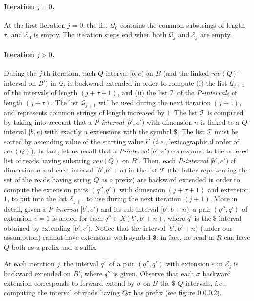\documentclass[runningheads,envcountsame,a4paper]{llncs}
\newcommand{\ie}{\textit{i.e.},\xspace}
\begin{document}
\paragraph{Iteration $j = 0$.}

At the first iteration $j=0$, the list $\mathcal{Q}_0$ contains the
common substrings of length $\tau$, and $\mathcal{E}_0$ is empty.
The iteration steps end when both $\mathcal{Q}_j$ and $\mathcal{E}_j$
are empty.

\paragraph{Iteration $j > 0$.}

During the $j$-th iteration, each $Q$-interval $[b, e)$ on $B$ (and the
linked $rev(Q)$-interval on $B'$) in $\mathcal{Q}_j$ is backward
extended in order to compute (i) the list $\mathcal{Q}_{j+1}$ of the
intervals of length $(j+\tau+1)$, and (ii) the list $\mathcal{T}$ of the
\emph{P-intervals} of length $(j+\tau)$.
The list $\mathcal{Q}_{j+1}$ will be used during the next iteration
$(j+1)$, and represents common strings of length increased by $1$.
The list $\mathcal{T}$ is computed by taking into account that a
\emph{P-interval} $[b', e')$ with dimension $n$ is linked to a
$Q$-interval $[b, e)$ with exactly $n$ extensions with the symbol $\$$.
The list $\mathcal{T}$ must be sorted by ascending value of the starting
value $b'$ (\ie lexicographical order of $rev(Q)$).
In fact, let us recall that a \emph{P-interval} $[b', e')$ correspond to
the ordered list of reads having substring $rev(Q)$ on $B'$.
Then, each \emph{P-interval} $[b', e')$ of dimension $n$ and each
interval $[b', b'+n)$ in the list $\mathcal{T}$ (the latter representing
the set of the reads having string $Q$ as a prefix) are backward
extended in order to compute the extension pairs $(q'', q')$ with
dimension $(j+\tau+1)$ and extension $1$, to put into the list
$\mathcal{E}_{j+1}$ to use during the next iteration $(j+1)$.
More in detail, given a \emph{P-interval} $[b',e')$ and its sub-interval
$[b',b+n)$, a pair $(q'',q')$ of extension $e=1$ is added for each $q''
\in X(b',b'+n)$, where $q'$ is the $\$$-interval obtained by extending
$[b',e')$.
Notice that the interval $[b', b'+n)$ (under our assumption) cannot have
extensions with symbol $\$$: in fact, no read in $R$ can have $Q$ both
as a prefix and a suffix.

At each iteration $j$, the interval $q''$ of a pair $(q'', q')$ with
extension $e$ in $\mathcal{E}_j$ is backward extended on $B'$, where
$q''$ is given.
Observe that each $\sigma$  backward extension corresponds to forward
extend by $\sigma$ on $B$ the  \$ $Q$-intervals, \ie computing the
interval of reads having $Q \sigma$ has prefix (see figure \ref{}).
\end{document}
